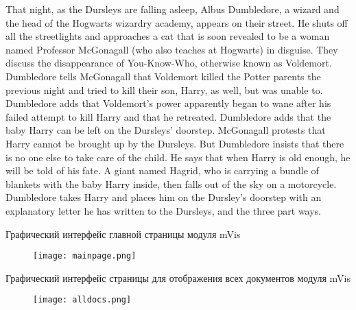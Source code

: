 That night, as the Dursleys are falling asleep, Albus Dumbledore, a wizard and the head of the Hogwarts wizardry academy, appears on their street. He shuts off all the streetlights and approaches a cat that is soon revealed to be a woman named Professor McGonagall (who also teaches at Hogwarts) in disguise. They discuss the disappearance of You-Know-Who, otherwise known as Voldemort. Dumbledore tells McGonagall that Voldemort killed the Potter parents the previous night and tried to kill their son, Harry, as well, but was unable to. Dumbledore adds that Voldemort’s power apparently began to wane after his failed attempt to kill Harry and that he retreated. Dumbledore adds that the baby Harry can be left on the Dursleys’ doorstep. McGonagall protests that Harry cannot be brought up by the Dursleys. But Dumbledore insists that there is no one else to take care of the child. He says that when Harry is old enough, he will be told of his fate. A giant named Hagrid, who is carrying a bundle of blankets with the baby Harry inside, then falls out of the sky on a motorcycle. Dumbledore takes Harry and places him on the Dursley’s doorstep with an explanatory letter he has written to the Dursleys, and the three part ways.

\newpage

\begin{flushright}
{} 
\end{flushright}
\begin{center}
Графический интерфейс главной страницы модуля mVis
\end{center}
\begin{figure}[H]
\centering
\texttt{[image: mainpage.png]}
\end{figure}

\newpage

\begin{flushright}
{} 
\end{flushright}
\begin{center}
Графический интерфейс страницы для отображения всех документов модуля mVis
\end{center}
\begin{figure}[H]
\centering
\texttt{[image: alldocs.png]}
\end{figure}

\newpage
